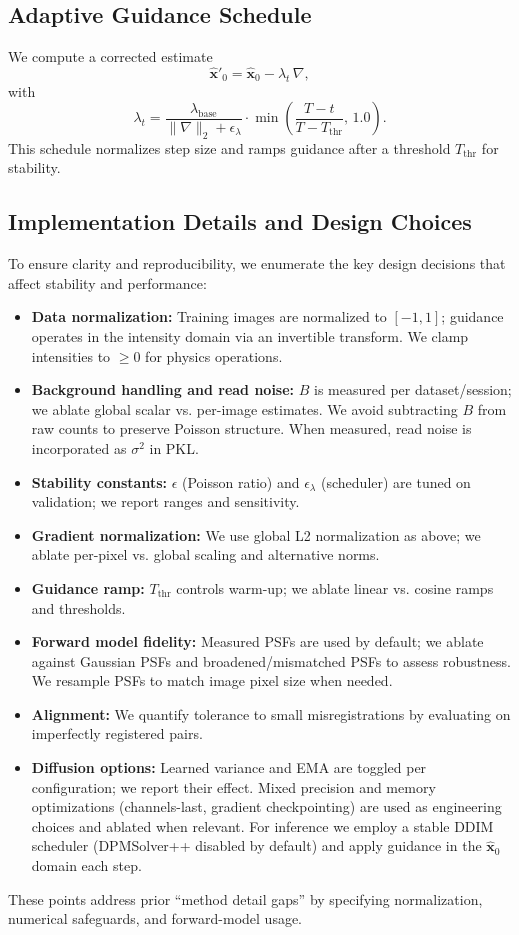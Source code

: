 \documentclass{article}
\begin{document}
\subsection{Adaptive Guidance Schedule}
We compute a corrected estimate
\begin{equation}
\hat{\mathbf{x}}'_0 = \hat{\mathbf{x}}_0 - \lambda_t\,\nabla,
\end{equation}
with
\begin{equation}
\lambda_t = \frac{\lambda_{\text{base}}}{\lVert\nabla\rVert_2 + \epsilon_\lambda}\cdot \min\left(\frac{T-t}{T-T_{\text{thr}}},\,1.0\right).
\end{equation}
This schedule normalizes step size and ramps guidance after a threshold $T_{\text{thr}}$ for stability.

\subsection{Implementation Details and Design Choices}
To ensure clarity and reproducibility, we enumerate the key design decisions that affect stability and performance:
\begin{itemize}
    \item \textbf{Data normalization:} Training images are normalized to $[-1,1]$; guidance operates in the intensity domain via an invertible transform. We clamp intensities to $\ge 0$ for physics operations.
    \item \textbf{Background handling and read noise:} $B$ is measured per dataset/session; we ablate global scalar vs. per-image estimates. We avoid subtracting $B$ from raw counts to preserve Poisson structure. When measured, read noise is incorporated as $\sigma^2$ in PKL.
    \item \textbf{Stability constants:} $\epsilon$ (Poisson ratio) and $\epsilon_\lambda$ (scheduler) are tuned on validation; we report ranges and sensitivity.
    \item \textbf{Gradient normalization:} We use global L2 normalization as above; we ablate per-pixel vs. global scaling and alternative norms.
    \item \textbf{Guidance ramp:} $T_{\text{thr}}$ controls warm-up; we ablate linear vs. cosine ramps and thresholds.
    \item \textbf{Forward model fidelity:} Measured PSFs are used by default; we ablate against Gaussian PSFs and broadened/mismatched PSFs to assess robustness. We resample PSFs to match image pixel size when needed.
    \item \textbf{Alignment:} We quantify tolerance to small misregistrations by evaluating on imperfectly registered pairs.
    \item \textbf{Diffusion options:} Learned variance and EMA are toggled per configuration; we report their effect. Mixed precision and memory optimizations (channels-last, gradient checkpointing) are used as engineering choices and ablated when relevant. For inference we employ a stable DDIM scheduler (DPMSolver++ disabled by default) and apply guidance in the $\hat{\mathbf{x}}_0$ domain each step.
\end{itemize}
These points address prior “method detail gaps” by specifying normalization, numerical safeguards, and forward-model usage.
\end{document}
